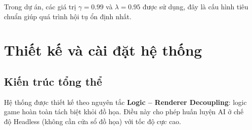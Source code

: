 \documentclass[a4paper, 12pt]{report}
\begin{document}
  Trong dự án, các giá trị $\gamma = 0.99$ và $\lambda = 0.95$ được sử dụng, đây là cấu hình tiêu chuẩn giúp quá trình hội tụ ổn định nhất.

  \chapter{Thiết kế và cài đặt hệ thống}

  \section{Kiến trúc tổng thể}

  Hệ thống được thiết kế theo nguyên tắc \textbf{Logic -- Renderer Decoupling}: logic game hoàn toàn tách biệt khỏi đồ họa. Điều này cho phép huấn luyện AI ở chế độ Headless (không cần cửa sổ đồ họa) với tốc độ cực cao.
\end{document}
